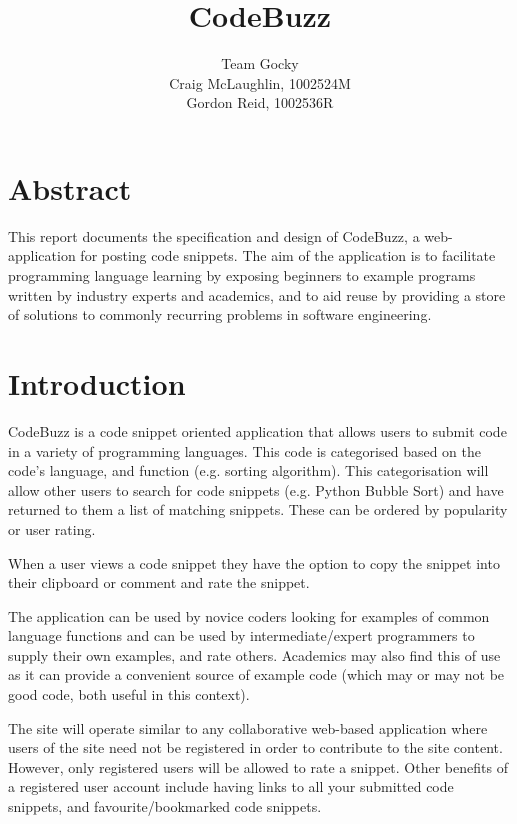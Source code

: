 \documentclass[11pt,a4paper]{article}
\title{CodeBuzz}
\author{Team Gocky \\
    Craig McLaughlin, 1002524M \\
    Gordon Reid, 1002536R}
\begin{document}
\maketitle

\newpage

\section*{Abstract}

This report documents the specification and design of CodeBuzz,
a web-application for posting code snippets. The aim of the application is
to facilitate programming language learning by exposing beginners to
example programs written by industry experts and academics, and to
aid reuse by providing a store of solutions to commonly recurring
problems in software engineering. 
\newpage

\tableofcontents
\newpage

\section{Introduction}

CodeBuzz is a code snippet oriented application that allows users to submit code
in a variety of programming languages. This code is categorised based on the
code's language, and function (e.g. sorting algorithm). This categorisation
will allow other users to search for code snippets (e.g. Python Bubble Sort)
and have returned to them a list of matching snippets. These can be ordered
by popularity or user rating.

When a user views a code snippet they have the option to copy the snippet into
their clipboard or comment and rate the snippet.

The application can be used by novice coders looking for examples of common
language functions and can be used by intermediate/expert programmers to supply
their own examples, and rate others. Academics may also find this of use as
it can provide a convenient source of example code (which may or may not be
good code, both useful in this context).

The site will operate similar to any collaborative web-based application
where users of the site need not be registered in order to contribute
to the site content. However, only registered users will be allowed to
rate a snippet. Other benefits of a registered user account include
having links to all your submitted code snippets, and
favourite/bookmarked code snippets.
\end{document}

